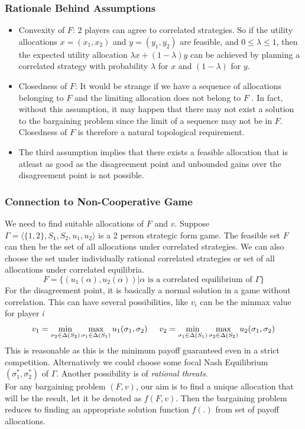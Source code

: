 \documentclass{article}
\theoremstyle{definition}
\begin{document}
\subsubsection*{Rationale Behind Assumptions}
\begin{itemize}
	\item Convexity of $F$: 2 players can agree to correlated strategies. So if the utility allocations $x = (x_1,x_2)$ and $y=(y_1,y_2)$ are feasible, and $0\leq \lambda \leq 1$, then the expected utility allocation $\lambda x + (1-\lambda)y$ can be achieved by planning a correlated strategy with probability $\lambda $ for $x$ and $(1-\lambda)$ for $y$.
	\item Closedness of $F$: It would be strange if we have a sequence of allocations belonging to $F$ and the limiting allocation does not belong to $F$ . In fact, without this assumption, it may happen that there may not exist a solution to the bargaining problem since the limit of a sequence may not be in $F$. Closedness of $F$ is therefore a natural topological requirement.
	\item The third assumption implies that there exists a feasible allocation that is atleast as good as the disagreement point and unbounded gains over the disagreement point is not possible.
\end{itemize}
\subsubsection*{Connection to Non-Cooperative Game}
We need to find suitable allocations of $F$ and $v$. Suppose $\Gamma = \langle \{1,2\}, S_1,S_2,u_1,u_2\rangle$ is a 2 person strategic form game. The feasible set $F$ can then be the set of all allocations under correlated strategies. We can also choose the set under individually rational correlated strategies or set of all allocations under correlated equilibria. $$F = \{(u_1(\alpha),u_2(\alpha))| \alpha \text{ is a correlated equilibrium of } \Gamma\}$$
For the disagreement point, it is basically a normal solution in a game without correlation. This can have several possibilities, like $v_i$ can be the minmax value for player $i$
$$v_1 = \min_{\sigma_2 \in \Delta(S_2)} \max_{\sigma_1 \in \Delta(S_1)} u_1(\sigma_1,\sigma_2)\hspace{5mm} v_2 = \min_{\sigma_1 \in \Delta(S_1)} \max_{\sigma_2 \in \Delta(S_2)} u_2(\sigma_1,\sigma_2)$$ This is reasonable as this is the minimum payoff guaranteed even in a strict competition. Alternatively we could choose some focal Nash Equilibrium $(\sigma_1^*,\sigma_2^*)$ of $\Gamma$. Another possibility is of \textit{rational threats}.\\
For any bargaining problem $(F,v)$, our aim is to find a unique allocation that will be the result, let it be denoted as $f(F,v)$. Then the bargaining problem reduces to finding an appropriate solution function $f(.)$ from set of payoff allocations.
\end{document}
